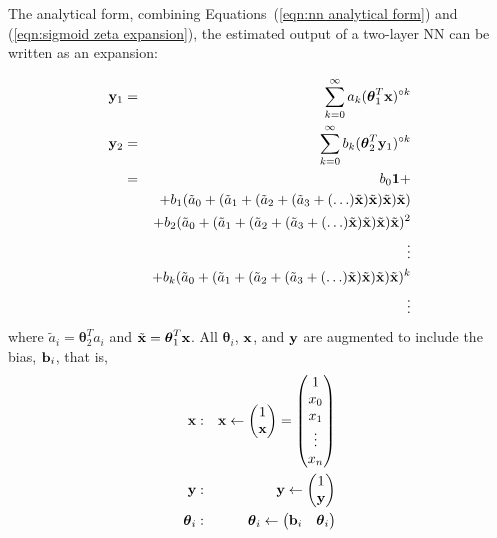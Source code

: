 The analytical form, combining Equations~(\ref{eqn:nn analytical form}) and (\ref{eqn:sigmoid zeta expansion}), the estimated output of a two-layer NN can be written as an expansion:

\begin{eqnarray}
	{\bold y}_1 & = & \sum_{k=0}^\infty a_k (\boldsymbol\theta_1^T {\bold x})\he{k} \nonumber \\
	{\bold y}_2 & = & \sum_{k=0}^\infty b_k (\boldsymbol\theta_2^T {\bold y}_1)\he{k} \nonumber \\
		& = & b_0 {\bold 1} + \nonumber\\
		&   & + b_1 (\tilde a_0 +%
					(\tilde a_1 + %
						(\tilde a_2 + %
							(\tilde a_3 + %
								(\ldots) \tilde {\bold x} )%
							\tilde {\bold x} )%
						\tilde {\bold x} )%
					\tilde {\bold x}) \nonumber \\
		&   & + b_2 (\tilde a_0 +%
					(\tilde a_1 + %
						(\tilde a_2 + %
							(\tilde a_3 + %
								(\ldots) \tilde {\bold x} )%
							\tilde {\bold x} )%
						\tilde {\bold x} )%
					\tilde {\bold x})^2 \nonumber \\
		&   & \vdots \nonumber \\
		&   & + b_k (\tilde a_0 +%
					(\tilde a_1 + %
						(\tilde a_2 + %
							(\tilde a_3 + %
								(\ldots) \tilde {\bold x} )%
							\tilde {\bold x} )%
						\tilde {\bold x} )%
					\tilde {\bold x})^k \nonumber \\
		&   & \vdots
\end{eqnarray}
\noindent where $\tilde a_i = \boldsymbol\theta_2^T a_i$ and $\tilde{\bold x} = \boldsymbol\theta_1^T {\bold x}$. All $\boldsymbol\theta_i$, ${\bold x}$, and ${\bold y}$ are augmented to include the bias, ${\bold b}_i$, that is,
\begin{eqnarray}
	{\bold x}&:& {\bold x} \leftarrow \begin{pmatrix}
								1 \\
								{\bold x}
							\end{pmatrix} = \begin{pmatrix}
											1 \\
											x_0 \\
											x_1 \\
											\vdots \\
											x_n
										\end{pmatrix}\\
	{\bold y}&:& {\bold y} \leftarrow \begin{pmatrix}
								1 \\
								{\bold y}
							\end{pmatrix} \\
	\boldsymbol\theta_i&:& \boldsymbol\theta_i \leftarrow \begin{pmatrix} {\bold b}_i & \boldsymbol\theta_i \end{pmatrix}
\end{eqnarray}


